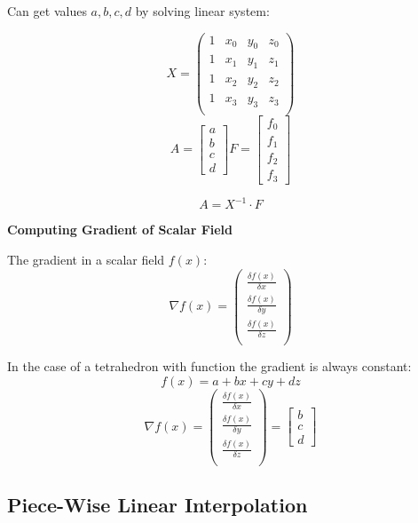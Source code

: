 Can get values $a, b, c, d$ by solving linear system:

$$X = \begin{pmatrix}
        1 & x_0 & y_0 & z_0 \\
        1 & x_1 & y_1 & z_1 \\
        1 & x_2 & y_2 & z_2 \\
        1 & x_3 & y_3 & z_3 \\
    \end{pmatrix}$$
$$A = \begin{bmatrix}
        a \\ b \\ c \\ d
    \end{bmatrix} F = \begin{bmatrix}
        f_0 \\ f_1 \\ f_2 \\ f_3
    \end{bmatrix}$$

$$A = X^{-1} \cdot F$$

\textbf{Computing Gradient of Scalar Field}

The gradient in a scalar field $f(x)$:
$$\nabla f(x) = \begin{pmatrix}
        \frac{\delta f(x)}{\delta x} \\
        \frac{\delta f(x)}{\delta y} \\
        \frac{\delta f(x)}{\delta z} \\
    \end{pmatrix}$$

In the case of a tetrahedron with function the gradient is always constant:
$$f(x) = a + bx + cy + dz$$
$$\nabla f(x) = \begin{pmatrix}
        \frac{\delta f(x)}{\delta x} \\
        \frac{\delta f(x)}{\delta y} \\
        \frac{\delta f(x)}{\delta z} \\
    \end{pmatrix} = \begin{bmatrix}
        b \\ c \\ d
    \end{bmatrix}$$

\subsection{Piece-Wise Linear Interpolation}

